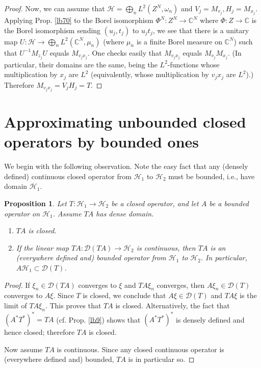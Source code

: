 \documentclass[12pt,b5paper,notitlepage]{article}
\theoremstyle{definition}
\theoremstyle{plain}
\newtheorem{pp}[df]{Proposition}
\newcommand{\mc}{\mathcal}
\newcommand{\Dom}{\scr D}
\newcommand{\scr}{\mathscr}
\newcommand{\Cbb}{\mathbb C}
\numberwithin{equation}{section}
\begin{document}
\begin{proof}
Now, we can assume that $\mc H=\bigoplus_n L^2(Z^N,\omega_n)$ and $V_j=M_{v_j},H_j=M_{x_j}$. Applying Prop. \ref{lb70} to the Borel isomorphism $\Phi^N:Z^N\rightarrow\Cbb^N$ where $\Phi:Z\rightarrow\Cbb$ is the Borel isomorphism sending $(u_j,t_j)$ to  $u_jt_j$, we see that there is a unitary map $U:\mc H\rightarrow\bigoplus_n L^2(\Cbb^N,\mu_n)$ (where $\mu_n$ is a finite Borel measure on $\Cbb^N$) such that $U^{-1}M_{z_j}U$ equals $M_{v_jx_j}$. One checks easily that $M_{v_jx_j}$ equals $M_{v_j}M_{x_j}$. (In particular, their domains are the same, being the $L^2$-functions whose multiplication by $x_j$  are $L^2$ (equivalently, whose multiplication by $v_jx_j$ are $L^2$).) Therefore $M_{v_jx_j}=V_jH_j=T$.
\end{proof}







\section{Approximating unbounded closed operators by bounded ones}\label{lb68}



We begin with the following observation. Note the easy fact that any (densely defined) continuous closed  operator from $\mc H_1$ to $\mc H_2$ must be bounded, i.e., have domain $\mc H_1$.

\begin{pp}\label{lb42}
Let $T:\mc H_1\rightarrow\mc H_2$ be a closed operator, and let $A$ be a bounded operator on $\mc H_1$. Assume $TA$ has dense domain. 
\begin{enumerate}
\item $TA$ is closed.
\item If the linear map $TA:\Dom(TA)\rightarrow\mc H_2$ is continuous, then $TA$ is an (everywhere defined and) bounded operator from $\mc H_1$ to $\mc H_2$. In particular, $A\mc H_1\subset\Dom(T)$.
\end{enumerate}
\end{pp}



\begin{proof}
If $\xi_n\in\Dom(TA)$ converges to $\xi$ and $TA\xi_n$ converges, then $A\xi_n\in\Dom(T)$ converges to $A\xi$. Since $T$ is closed, we conclude that $A\xi\in\Dom(T)$ and $TA\xi$ is the limit of $TA\xi_n$. This proves that $TA$ is closed. Alternatively, the fact that $(A^*T^*)^*=TA$ (cf. Prop. \ref{lb9}) shows that $(A^*T^*)^*$ is densely defined and hence closed; therefore $TA$ is closed.

Now assume $TA$ is continuous. Since any closed continuous operator is (everywhere defined and) bounded, $TA$ is in particular so.
\end{proof}
\end{document}
